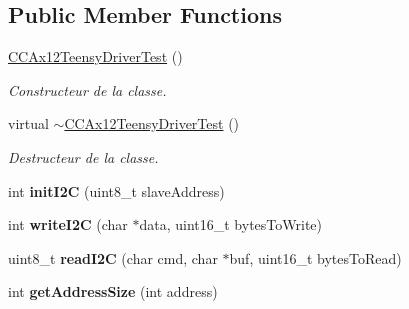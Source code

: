 \subsection*{Public Member Functions}
\begin{DoxyCompactItemize}
\item 
\mbox{\label{classtest_1_1CCAx12TeensyDriverTest_a90e0206b5763d248ef8b3e749e4e1438}} 
\hyperlink{classtest_1_1CCAx12TeensyDriverTest_a90e0206b5763d248ef8b3e749e4e1438}{C\+C\+Ax12\+Teensy\+Driver\+Test} ()
\begin{DoxyCompactList}\small\item\em Constructeur de la classe. \end{DoxyCompactList}\item 
\mbox{\label{classtest_1_1CCAx12TeensyDriverTest_ad188153074af82a730351024b8c421e5}} 
virtual \hyperlink{classtest_1_1CCAx12TeensyDriverTest_ad188153074af82a730351024b8c421e5}{$\sim$\+C\+C\+Ax12\+Teensy\+Driver\+Test} ()
\begin{DoxyCompactList}\small\item\em Destructeur de la classe. \end{DoxyCompactList}\item 
\mbox{\label{classtest_1_1CCAx12TeensyDriverTest_a13100466f210fca42fdfaf9ef2d9bfbc}} 
int {\bfseries init\+I2C} (uint8\+\_\+t slave\+Address)
\item 
\mbox{\label{classtest_1_1CCAx12TeensyDriverTest_a0d00657c5ab4f248e6e49119c2ad69f8}} 
int {\bfseries write\+I2C} (char $\ast$data, uint16\+\_\+t bytes\+To\+Write)
\item 
\mbox{\label{classtest_1_1CCAx12TeensyDriverTest_afd15ca83ea1cb99e8977220b592cfa0a}} 
uint8\+\_\+t {\bfseries read\+I2C} (char cmd, char $\ast$buf, uint16\+\_\+t bytes\+To\+Read)
\item 
\mbox{\label{classtest_1_1CCAx12TeensyDriverTest_ac3387d0ed87c800c250c2876154c48b1}} 
int {\bfseries get\+Address\+Size} (int address)
\item 
\mbox{\label{classtest_1_1CCAx12TeensyDriverTest_a28c1794a8d0538b82c49b6a026af123d}} 

\end{DoxyCompactItemize}
